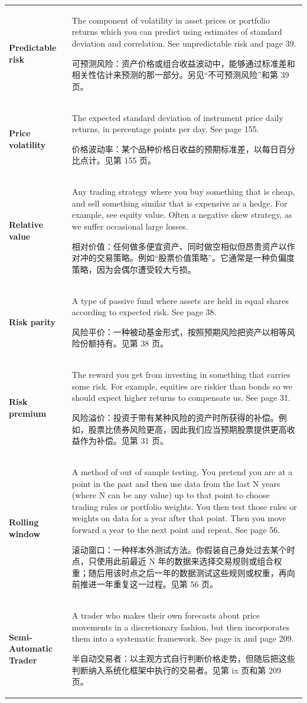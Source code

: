 \begin{chinesetableblock}
{\begin{longtable}{@{}>{\raggedright\arraybackslash\bfseries} p{}>{\raggedright\arraybackslash} p{}@{}}
Predictable risk & The component of volatility in asset prices or portfolio returns which you can predict using estimates of standard deviation and correlation. See unpredictable risk and page 39. \par 可预测风险：资产价格或组合收益波动中，能够通过标准差和相关性估计来预测的那一部分。另见“不可预测风险”和第 39 页。 \\[0.65em]
Price volatility & The expected standard deviation of instrument price daily returns, in percentage points per day. See page 155. \par 价格波动率：某个品种价格日收益的预期标准差，以每日百分比点计。见第 155 页。 \\[0.65em]
Relative value & Any trading strategy where you buy something that is cheap, and sell something similar that is expensive as a hedge. For example, see equity value. Often a negative skew strategy, as we suffer occasional large losses. \par 相对价值：任何做多便宜资产、同时做空相似但昂贵资产以作对冲的交易策略。例如“股票价值策略”。它通常是一种负偏度策略，因为会偶尔遭受较大亏损。 \\[0.65em]
Risk parity & A type of passive fund where assets are held in equal shares according to expected risk. See page 38. \par 风险平价：一种被动基金形式，按照预期风险把资产以相等风险份额持有。见第 38 页。 \\[0.65em]
Risk premium & The reward you get from investing in something that carries some risk. For example, equities are riskier than bonds so we should expect higher returns to compensate us. See page 31. \par 风险溢价：投资于带有某种风险的资产时所获得的补偿。例如，股票比债券风险更高，因此我们应当预期股票提供更高收益作为补偿。见第 31 页。 \\[0.65em]
Rolling window & A method of out of sample testing. You pretend you are at a point in the past and then use data from the last N years (where N can be any value) up to that point to choose trading rules or portfolio weights. You then test those rules or weights on data for a year after that point. Then you move forward a year to the next point and repeat. See page 56. \par 滚动窗口：一种样本外测试方法。你假装自己身处过去某个时点，只使用此前最近 N 年的数据来选择交易规则或组合权重；随后用该时点之后一年的数据测试这些规则或权重，再向前推进一年重复这一过程。见第 56 页。 \\[0.65em]
Semi-Automatic Trader & A trader who makes their own forecasts about price movements in a discretionary fashion, but then incorporates them into a systematic framework. See page ix and page 209. \par 半自动交易者：以主观方式自行判断价格走势，但随后把这些判断纳入系统化框架中执行的交易者。见第 ix 页和第 209 页。 \\[0.65em]

\end{longtable}}
\end{chinesetableblock}
